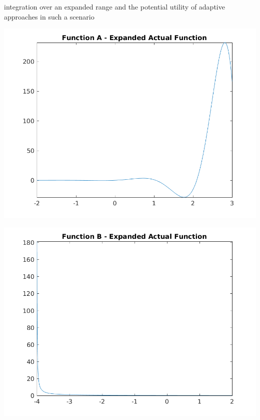 \documentclass[a4paper]{article}
\begin{document}
 integration over an expanded range and the potential utility of adaptive approaches in such a scenario

\begin{center}
	\includegraphics[width=1\textwidth]{../output/a_expanded_actual.png}
	\label{fig:a_ex}
\end{center}


\begin{center}
	\includegraphics[width=1\textwidth]{../output/b_expanded_actual.png}
	\label{fig:b_ex}
\end{center}











\newpage


\end{document}
